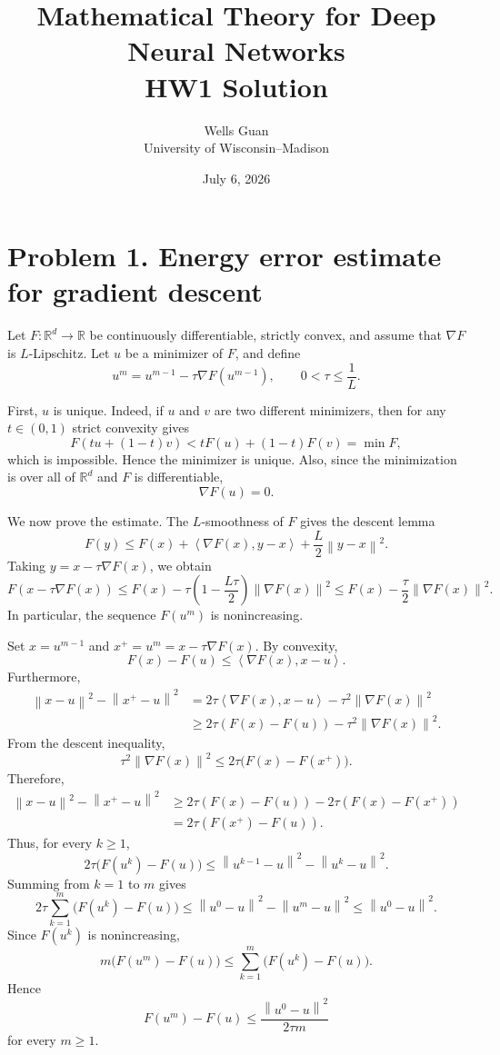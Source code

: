 \documentclass[11pt]{article}
\title{Mathematical Theory for Deep Neural Networks\\HW1 Solution}
\author{Wells Guan\\University of Wisconsin--Madison}
\date{July 6, 2026}
\newcommand{\R}{\mathbb{R}}
\newcommand{\norm}[1]{\left\lVert #1\right\rVert}
\newcommand{\ip}[2]{\left\langle #1,#2\right\rangle}
\begin{document}
\maketitle

\section*{Problem 1. Energy error estimate for gradient descent}

Let $F:\R^d\to\R$ be continuously differentiable, strictly convex, and assume that $\nabla F$ is $L$-Lipschitz. Let $u$ be a minimizer of $F$, and define
\[
  u^m=u^{m-1}-\tau \nabla F(u^{m-1}),\qquad 0<\tau\le \frac1L.
\]

First, $u$ is unique. Indeed, if $u$ and $v$ are two different minimizers, then for any $t\in(0,1)$ strict convexity gives
\[
  F(tu+(1-t)v)<tF(u)+(1-t)F(v)=\min F,
\]
which is impossible. Hence the minimizer is unique. Also, since the minimization is over all of $\R^d$ and $F$ is differentiable,
\[
  \nabla F(u)=0.
\]

We now prove the estimate. The $L$-smoothness of $F$ gives the descent lemma
\[
  F(y)\le F(x)+\ip{\nabla F(x)}{y-x}+\frac L2\norm{y-x}^2.
\]
Taking $y=x-\tau\nabla F(x)$, we obtain
\[
  F(x-\tau\nabla F(x))
  \le F(x)-\tau\left(1-\frac{L\tau}{2}\right)\norm{\nabla F(x)}^2
  \le F(x)-\frac{\tau}{2}\norm{\nabla F(x)}^2.
\]
In particular, the sequence $F(u^m)$ is nonincreasing.

Set $x=u^{m-1}$ and $x^+=u^m=x-\tau\nabla F(x)$. By convexity,
\[
  F(x)-F(u)\le \ip{\nabla F(x)}{x-u}.
\]
Furthermore,
\[
\begin{aligned}
  \norm{x-u}^2-\norm{x^+-u}^2
  &=2\tau\ip{\nabla F(x)}{x-u}-\tau^2\norm{\nabla F(x)}^2 \\
  &\ge 2\tau(F(x)-F(u))-\tau^2\norm{\nabla F(x)}^2.
\end{aligned}
\]
From the descent inequality,
\[
  \tau^2\norm{\nabla F(x)}^2
  \le 2\tau\bigl(F(x)-F(x^+)\bigr).
\]
Therefore,
\[
\begin{aligned}
  \norm{x-u}^2-\norm{x^+-u}^2
  &\ge 2\tau(F(x)-F(u))-2\tau(F(x)-F(x^+)) \\
  &=2\tau(F(x^+)-F(u)).
\end{aligned}
\]
Thus, for every $k\ge1$,
\[
  2\tau\bigl(F(u^k)-F(u)\bigr)
  \le \norm{u^{k-1}-u}^2-\norm{u^k-u}^2.
\]
Summing from $k=1$ to $m$ gives
\[
  2\tau\sum_{k=1}^m \bigl(F(u^k)-F(u)\bigr)
  \le \norm{u^0-u}^2-\norm{u^m-u}^2
  \le \norm{u^0-u}^2.
\]
Since $F(u^k)$ is nonincreasing,
\[
  m\bigl(F(u^m)-F(u)\bigr)
  \le \sum_{k=1}^m \bigl(F(u^k)-F(u)\bigr).
\]
Hence
\[
  \boxed{
  F(u^m)-F(u)
  \le \frac{\norm{u^0-u}^2}{2\tau m}
  }
\]
for every $m\ge1$.
\end{document}
